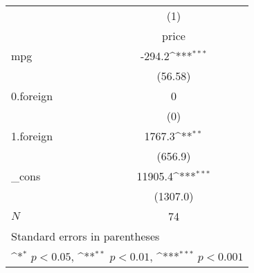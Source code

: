 {
\def\sym#1{\ifmmode^{#1}\else\(^{#1}\)\fi}
\begin{tabular}{l*{1}{c}}
\hline\hline
            &\multicolumn{1}{c}{(1)}\\
            &\multicolumn{1}{c}{price}\\
\hline
mpg         &      -294.2\sym{***}\\
            &     (56.58)         \\
[1em]
0.foreign   &           0         \\
            &         (0)         \\
[1em]
1.foreign   &      1767.3\sym{**} \\
            &     (656.9)         \\
[1em]
\_cons      &     11905.4\sym{***}\\
            &    (1307.0)         \\
\hline
\(N\)       &          74         \\
\hline\hline
\multicolumn{2}{l}{\footnotesize Standard errors in parentheses}\\
\multicolumn{2}{l}{\footnotesize \sym{*} \(p<0.05\), \sym{**} \(p<0.01\), \sym{***} \(p<0.001\)}\\
\end{tabular}
}
